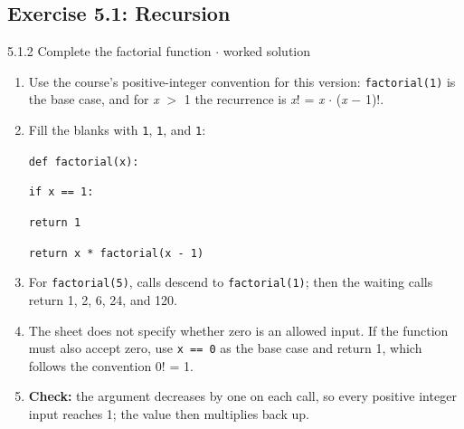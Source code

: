 \documentclass[11pt]{article}
\begin{document}
\begin{keepsection}\subsection{Exercise 5.1: Recursion}

\begin{workedbox}{5.1.2 Complete the factorial function \ensuremath{\cdot} worked solution}
\begin{enumerate}
\item Use the course's positive-integer convention for this version: \texttt{factorial(1)} is the base case, and for \textit{x} \ensuremath{>} 1 the recurrence is \textit{x}! = \textit{x} \ensuremath{\cdot} (\textit{x} \ensuremath{-} 1)!.
\item {}
Fill the blanks with \texttt{1}, \texttt{1}, and \texttt{1}:
\begin{tcolorbox}[colback=Paperblue,colframe=Paperblue,boxrule=0pt,arc=0pt,left=7pt,right=7pt,top=5pt,bottom=5pt]\small\sloppy
\noindent\hspace*{0em}\texttt{def factorial(x):}\par
\noindent\hspace*{1em}\texttt{if x == 1:}\par
\noindent\hspace*{3em}\texttt{return 1}\par
\noindent\hspace*{1em}\texttt{return x * factorial(x - 1)}\par
\end{tcolorbox}
\item For \texttt{factorial(5)}, calls descend to \texttt{factorial(1)}; then the waiting calls return 1, 2, 6, 24, and 120.
\item The sheet does not specify whether zero is an allowed input. If the function must also accept zero, use \texttt{x == 0} as the base case and return 1, which follows the convention 0! = 1.
\item \textbf{Check:} the argument decreases by one on each call, so every positive integer input reaches 1; the value then multiplies back up.
\end{enumerate}
\end{workedbox}

\end{keepsection}
\end{document}
